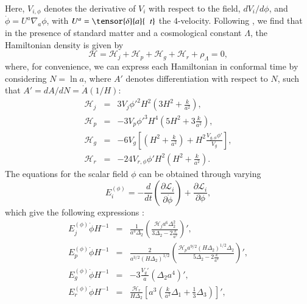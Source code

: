\documentclass[onecolumn,superscriptaddress,secnumarabic,amssymb,amsmath,nobibnotes,aps,prd,nofootinbib,altaffilletter]{revtex4}
\newcommand{\ham}{\mathcal{H}}
\newcommand{\lag}{\mathcal{L}}
\begin{document}
Here, $V_{i,\phi}$ denotes the derivative of $V_i$ with respect to the field, ${d V_i}/{d \phi}$, and $\dot \phi=U^a\nabla_a \phi$, with $U^a=\tensor{\delta}{a}{\;\;  t}$ the $4$-velocity.
Following \cite{Copeland:2012qf}, we find that in the presence of standard matter and a cosmological constant $\Lambda$, the Hamiltonian density is given by
\begin{equation}
    \ham = \ham_j + \ham_p + \ham_g + \ham_r + \rho_{\Lambda}=0,
    \label{eq:hambuena}
\end{equation}
where, for convenience, we can express each Hamiltonian in conformal time by considering $N=\ln{a}$, where $A'$ denotes differentiation with respect to $N$, such that $A' = {dA}/{dN} = \dot{A}(1/H)$:
\begin{eqnarray}
    \ham_{j}&=&3V_{j}{\phi'}^2 H^2 \left(3H^2+\frac{k}{a^2}\right) \label{eq:hamjN},\\
    \ham_{p}&=&-3V_{p}{\phi'}^3H^4\left(5H^2+3\frac{k}{a^2}\right)
    \label{eq:hampN},\\
    \ham_{g}&=&-6V_{g}\left[\left(H^2+\frac{k}{a^2}\right)+H^2  \frac{V_{{g},\phi}\phi' }{V_{g}}\right]
    \label{eq:hamgN},\\
    \ham_{r}&=&-24V_{{r},\phi}\phi' H^2 \left(H^2+\frac{k}{a^2}\right)
    \label{eq:hamrN}.
\end{eqnarray}
The equations for the scalar field $\phi$ can be obtained through varying
\begin{equation}
    E_i^{(\phi)}=-\frac{d}{dt}\left(\frac{\partial \lag_i}{\partial \dot{\phi}}\right) + \frac{\partial \lag_i}{\partial \phi},
    \label{eq:eulerlagrange}
\end{equation}
which give the following expressions \cite{Copeland:2012qf}:
\begin{eqnarray}
    E^{(\phi)}_j \dot \phi H^{-1}&=&\frac{1}{a^3 \Delta_2} \left(\frac{\ham_j a^6 \Delta_2^2}{3 \Delta_2-2\frac{k}{a^2}} \right)'
    \label{eq:eomj},\\
    E^{(\phi)}_p\dot \phi H^{-1}&=&\frac{2}{a^{3/2} (H \Delta_2)^{1/2}} \left(\frac{\ham_p a^{9/2} (H\Delta_2)^{1/2} \Delta_2 }{5\Delta_2-2\frac{k}{a^2}} \right)'
    \label{eq:eomp},\\
    E^{(\phi)}_g\dot \phi H^{-1}&=&-3\frac{V_g'}{a} (\Delta_2 a^4)'
    \label{eq:eomg},\\
    E^{(\phi)}_r \dot \phi H^{-1}&=& \frac{\ham_r}{H \Delta_2} \left[a^3\left(\frac{k}{a^2}\Delta_1 +\frac{1}{3}  \Delta_3 \right) \right]'
    \label{eq:eomr},
\end{eqnarray}
\end{document}
